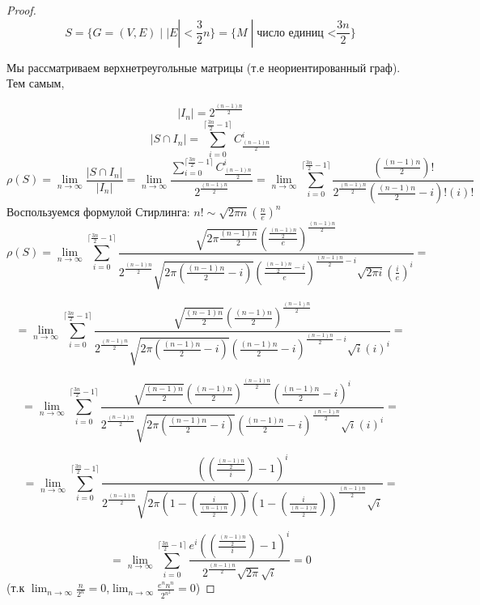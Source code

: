 \documentclass[a4paper, 12pt]{article}
\theoremstyle{definition}
\theoremstyle{remark}
\begin{document}
\begin{proof}
    \[S = \{G = (V, E) \;|\; |E| <\frac32 n\} = \{M \;|\; \text{число единиц <}\frac{3n}{2}\}\]

    Мы рассматриваем верхнетреугольные матрицы (т.е неориентированный граф). Тем самым,
    
    \[|I_n| = 2^{\frac{(n-1)n}{2}}\]
    \[|S \cap I_n| = \sum_{i = 0}^{\lceil \frac{3n}{2} - 1 \rceil} C_{\frac{(n-1)n}{2}}^{i}\]
    \[\rho (S) = \lim_{n\to\infty} \frac{|S \cap I_n|}{|I_n|} = \lim_{n\to \infty} \frac{\sum_{i = 0}^{\lceil \frac{3n}{2} - 1 \rceil} C_{\frac{(n-1)n}{2}}^{i}}{2^{\frac{(n-1)n}{2}}} = \lim_{n\to\infty} \sum_{i=0}^{\lceil \frac{3n}{2} - 1 \rceil}\frac{(\frac{(n-1)n}{2})!}{2^{\frac{(n-1)n}{2}}(\frac{(n-1)n}{2} - i)!(i)! }\]
    Воспользуемся формулой Стирлинга: $n! \sim \sqrt{2 \pi n} \left(\frac{n}{e}\right)^n$
    \[\rho (S) = \lim_{n\to\infty} \sum_{i=0}^{\lceil \frac{3n}{2} - 1 \rceil} \frac{\sqrt{2\pi \frac{(n-1)n}{2}} {(\frac{\frac{(n-1)n}{2}}{e})}^{\frac{(n-1)n}{2}}}{2^{\frac{(n-1)n}{2}} \sqrt{2\pi (\frac{(n-1)n}{2} - i)} {(\frac{\frac{(n-1)n}{2} - i}{e})}^{\frac{(n-1)n}{2} - i}      \sqrt{2\pi i} {(\frac{i}{e})}^{i}} =\]

    \[= \lim_{n\to\infty} \sum_{i=0}^{\lceil \frac{3n}{2} - 1 \rceil} \frac{\sqrt{\frac{(n-1)n}{2}} {({\frac{(n-1)n}{2}})}^{\frac{(n-1)n}{2}} }{2^{\frac{(n-1)n}{2}} \sqrt{2\pi (\frac{(n-1)n}{2} - i)} {({\frac{(n-1)n}{2} - i})}^{\frac{(n-1)n}{2} - i}      \sqrt{i} {({i})}^{i}} = \]

    \[=\lim_{n\to\infty} \sum_{i=0}^{\lceil \frac{3n}{2} - 1 \rceil} \frac{\sqrt{\frac{(n-1)n}{2}} {({\frac{(n-1)n}{2}})}^{\frac{(n-1)n}{2}} {({\frac{(n-1)n}{2} - i})}^{{i}}}{2^{\frac{(n-1)n}{2}} \sqrt{2\pi (\frac{(n-1)n}{2} - i)} {({\frac{(n-1)n}{2} - i})}^{\frac{(n-1)n}{2} }      \sqrt{i} {({i})}^{i}} =\]

    \[=\lim_{n\to\infty} \sum_{i=0}^{\lceil \frac{3n}{2} - 1 \rceil}  \frac{  {({(\frac{\frac{(n-1)n}{2}}{i}) - 1})}^{{i}}}{2^{\frac{(n-1)n}{2}} \sqrt{2\pi (1 - (\frac{i}{\frac{(n-1)n}{2}}))} {({1 - (\frac{i}{\frac{(n-1)n}{2}})})}^{\frac{(n-1)n}{2} }      \sqrt{i} } =\]
    
    \[=\lim_{n\to\infty} \sum_{i=0}^{\lceil \frac{3n}{2} - 1 \rceil} \frac{  e^{i}{({(\frac{\frac{(n-1)n}{2}}{i}) - 1})}^{{i}}}{2^{\frac{(n-1)n}{2}} \sqrt{2\pi}       \sqrt{i} } = 0\]
    (т.к $\lim_{n\to \infty}\frac{n}{2^n} = 0$,$\lim_{n\to \infty} \frac{e^n n^n}{2^{n^2}} = 0$)
\end{proof}
\end{document}
